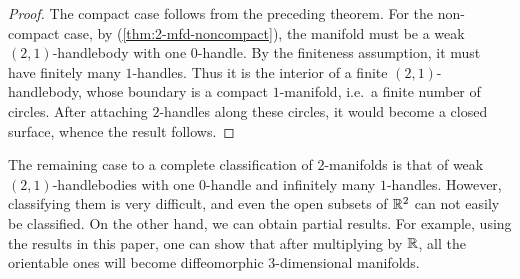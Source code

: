\begin{proof}
The compact case follows from the preceding theorem.
For the non-compact case, by (\ref{thm:2-mfd-noncompact}),
the manifold must be a weak $(2,1)$-handlebody with one $0$-handle.
By the finiteness assumption, it must have finitely many $1$-handles.
Thus it is the interior of a finite $(2,1)$-handlebody,
whose boundary is a compact $1$-manifold, i.e.\ a finite number of circles.
After attaching $2$-handles along these circles,
it would become a closed surface, whence the result follows.
\end{proof}

The remaining case to a complete classification of $2$-manifolds
is that of weak $(2,1)$-handlebodies
with one $0$-handle and infinitely many $1$-handles.
However, classifying them is very difficult,
and even the open subsets of $\mathbb{R}^2$ can not easily be classified.
On the other hand, we can obtain partial results.
For example, using the results in this paper, one can show that
after multiplying by $\mathbb{R}$,
all the orientable ones will become diffeomorphic $3$-dimensional manifolds.
